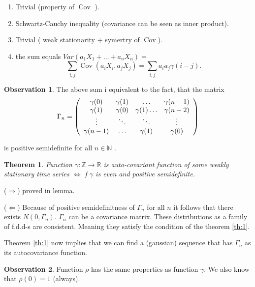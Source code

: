 \documentclass[12pt,a4paper, notitlepage]{book}
\theoremstyle{definition} %
\newtheorem*{observation}{Observation}
\theoremstyle{plain} %
\newtheorem{theorem}{Theorem}
\newcommand{\R}{\mathbb R}
\newcommand{\N}{\mathbb N}
\newcommand{\Z}{\mathbb Z}
\DeclareMathOperator{\Cov}{Cov}
\begin{document}
\proof
\begin{enumerate}
\item Trivial (property of $ \Cov $ ).
\item Schwartz-Cauchy inequality (covariance can be seen as inner product).
\item Trivial ( weak stationarity + symertry of $ \Cov $).
\item the sum equals $Var(a_1X_1 + \dots + a_n X_n) =$
\[  \sum_{i,j} \Cov(a_iX_i,a_jX_j) = \sum _{ i,j} a_i a_j \gamma(i-j) . \] 
\end{enumerate}
\endproof

\begin{observation}
The above sum i equivalent to the fact, that the
matrix 
\[ \Gamma_n = 
\left( \begin{array} {c c c c} 
 \gamma(0) & \gamma(1)  & \ldots & \gamma(n-1) \\
\gamma(1) & \gamma(0) & \gamma(1) \ldots & \gamma(n-2) \\
\vdots & \ddots & \ddots & \vdots \\
\gamma(n-1) & \ldots & \gamma(1) & \gamma(0)
\end{array} \right)
\]

is positive semidefinite for all $ n \in \N $ .
\end{observation}


\begin{theorem}
Function $\gamma: \Z \rightarrow \R$ is auto-covariant function of some weakly stationary time series 
$ \iff  $ f
$\gamma$ is even and positive semidefinite.
\end{theorem}


\proof
($\Rightarrow$) proved in lemma.

($ \Leftarrow$) Because of positive semidefinitness of $\Gamma_n$ for all $n$ it follows that there exists $N(0, \Gamma_n)$. $
\Gamma_n$ can be a covariance matrix. These distributions as a family of f.d.d-s are consistent. Meaning they satisfy the 
condition of the theorem 
\ref{th:1}.

Theorem \ref{th:1} now implies that we can find a (gaussian) sequence that has $\Gamma_n$ as its autocovariance function.

\endproof

\begin{observation}
Function $\rho$ has the same properties as function $\gamma$. We also know that $\rho(0) = 1$ (always).
\end{observation}
\end{document}
